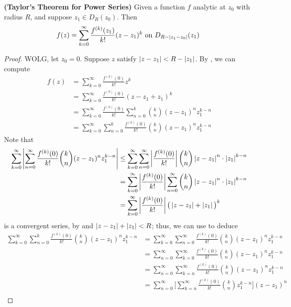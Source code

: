 \documentclass{report}
\begin{document}
\begin{theorem}
\label{TT}
  \textbf{(Taylor's Theorem for Power Series)} Given a function $f$ analytic at $z_0$ with radius $R$, and suppose $z_1\in D_R(z_0)$. Then 
\begin{align*}
f(z)=\sum_{k=0}^\infty \frac{f^{(k)}(z_1)}{k!}(z-z_1)^k\text{ on $D_{R- \left|z_1-z_0\right|}(z_1)$ }
\end{align*}
\end{theorem}
\begin{proof}
WOLG, let $z_0=0$. Suppose $z$ satisfy $\left|z-z_1\right|<R-\left|z_1\right|$. By , we can compute 
 \begin{align*}
f(z)&=\sum_{k=0}^{\infty}\frac{f^{(k)}(0)}{k!}z^k\\
&=\sum_{k=0}^{\infty}\frac{f^{(k)}(0)}{k!}(z-z_1+z_1)^k\\
&=\sum_{k=0}^{\infty}\frac{f^{(k)}(0)}{k!}\sum_{n=0}^k \binom{k}{n} (z-z_1)^n z_1^{k-n}\\
&=\sum_{k=0}^\infty \sum_{n=0}^k \frac{f^{(k)}(0)}{k!}\binom{k}{n}(z-z_1)^n z_1^{k-n}
\end{align*}
Note that 
\begin{align*}
  \sum_{k=0}^\infty \left|\sum_{n=0}^\infty \frac{f^{(k)}(0)}{k!}\binom{k}{n}(z-z_1)^n z_1^{k-n}\right|&\leq \sum_{k=0}^\infty \sum_{n=0}^\infty \left|\frac{f^{(k)}(0)}{k!}\right|\binom{k}{n}\left|z-z_1\right|^n \cdot \left|z_1\right|^{k-n}\\
  &=\sum_{k=0}^{\infty} \left|\frac{f^{(k)}(0)}{k!}\right|\sum_{n=0}^{\infty}\binom{k}{n}\left|z-z_1\right|^{n}\cdot \left|z_1\right|^{k-n}\\
  &=\sum_{k=0}^\infty \left|\frac{f^{(k)}(0)}{k!}\right| \big(\left|z-{z_1}\right|+\left|z_1\right| \big)^k
\end{align*}
is a convergent series, by  and $\left|z-z_1\right|+\left|z_1\right|<R$; thus, we can use  to deduce 
\begin{align*}
\sum_{k=0}^\infty \sum_{n=0}^{k} \frac{f^{(k)}(0)}{k!}\binom{k}{n}(z-z_1)^{n}z_1^{k-n}&=\sum_{k=0}^\infty \sum_{n=0}^{\infty} \frac{f^{(k)}(0)}{k!} \binom{k}{n}(z-z_1)^n z_1^{k-n}\\
&=\sum_{n=0}^\infty \sum_{k=0}^\infty \frac{f^{(k)}(0)}{k!} \binom{k}{n}(z-z_1)^n z_1^{k-n}\\
&=\sum_{n=0}^\infty \sum_{k=n}^\infty \frac{f^{(k)}(0)}{k!} \binom{k}{n}(z-z_1)^n z_1^{k-n}\\
&=\sum_{n=0}^\infty \Big[ \sum_{k=n}^\infty \frac{f^{(k)}(0)}{k!} \binom{k}{n}z_1^{k-n}\Big] (z-z_1)^n\\

\end{align*}
\end{proof}
\end{document}
